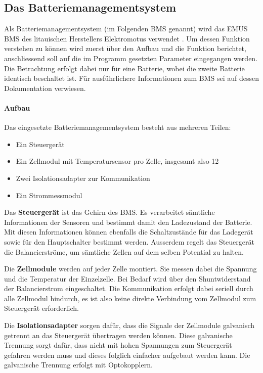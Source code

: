 \subsection{Das Batteriemanagementsystem}

Als Batteriemanagementsystem (im Folgenden BMS genannt) wird das EMUS BMS des litauischen Herstellers Elektromotus verwendet \cite{emus}. Um dessen Funktion verstehen zu können wird zuerst über den Aufbau und die Funktion berichtet, anschliessend soll auf die im Programm gesetzten Parameter eingegangen werden. Die Betrachtung erfolgt dabei nur für eine Batterie, wobei die zweite Batterie identisch beschaltet ist. Für ausführlichere Informationen zum BMS sei auf dessen Dokumentation \cite{bms} verwiesen.

\paragraph{Aufbau}
Das eingesetzte Batteriemanagementsystem besteht aus mehreren Teilen: \begin{itemize}
	\item Ein Steuergerät
	\item Ein Zellmodul mit Temperatursensor pro Zelle, insgesamt also 12
	\item Zwei Isolationsadapter zur Kommunikation
	\item Ein Strommessmodul
\end{itemize}

Das \textbf{Steuergerät} ist das Gehirn des BMS. Es verarbeitet sämtliche Informationen der Sensoren und bestimmt damit den Ladezustand der Batterie. Mit diesen Informationen können ebenfalls die Schaltzustände für das Ladegerät sowie für den Hauptschalter bestimmt werden. Ausserdem regelt das Steuergerät die Balancierströme, um sämtliche Zellen auf dem selben Potential zu halten.

Die \textbf{Zellmodule} werden auf jeder Zelle montiert. Sie messen dabei die Spannung und die Temperatur der Einzelzelle. Bei Bedarf wird über den Shuntwiderstand der Balancierstrom eingeschaltet. Die Kommunikation erfolgt dabei seriell durch alle Zellmodul hindurch, es ist also keine direkte Verbindung vom Zellmodul zum Steuergerät erforderlich.

Die \textbf{Isolationsadapter} sorgen dafür, dass die Signale der Zellmodule galvanisch getrennt an das Steuergerät übertragen werden können. Diese galvanische Trennung sorgt dafür, dass nicht mit hohen Spannungen zum Steuergerät gefahren werden muss und dieses folglich einfacher aufgebaut werden kann. Die galvanische Trennung erfolgt mit Optokopplern.

